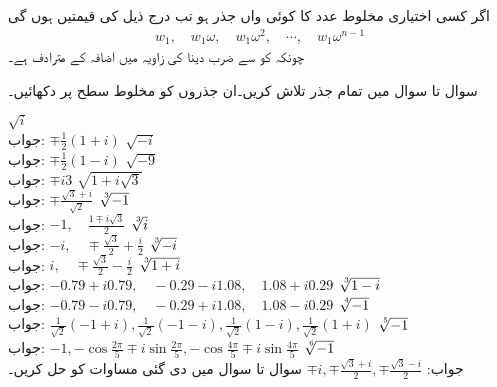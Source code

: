 اگر کسی اختیاری مخلوط عدد  کا کوئی  واں جذر  ہو تب درج ذیل  کی  قیمتیں ہوں گی
\begin{align*}
w_1,\quad w_1\omega,\quad w_1\omega^2,\quad \cdots, \quad w_1\omega^{n-1}
\end{align*}
چونکہ  کو  سے ضرب دینا  کی زاویہ میں  اضافہ کے مترادف ہے۔

سوال  تا سوال  میں تمام جذر تلاش کریں۔ان جذروں کو مخلوط سطح پر دکھائیں۔

\quad 
$\sqrt{i}$\\
جواب:\quad
$\mp\tfrac{1}{2}(1+i)$
\quad 
$\sqrt{-i}$\\
جواب:\quad
$\mp\tfrac{1}{2}(1-i)$
\quad 
$\sqrt{-9}$\\
جواب:\quad
$\mp i 3$
\quad 
$\sqrt{1+i\sqrt{3}}$\\
جواب:\quad
$ \mp\tfrac{\sqrt{3}+i}{\sqrt{2}}$
\quad 
$\sqrt[\leftroot{-2}\uproot{2}3]{-1}$\\
جواب:\quad
$-1,\quad \tfrac{1\mp i\sqrt{3}}{2}$
\quad 
$\sqrt[\leftroot{-2}\uproot{2}3]{i}$\\
جواب:\quad
$-i,\quad \mp\tfrac{\sqrt{3}}{2}+\tfrac{i}{2}$
\quad 
$\sqrt[\leftroot{-2}\uproot{2}3]{-i}$\\
جواب:\quad
$i,\quad \mp\tfrac{\sqrt{3}}{2}-\tfrac{i}{2}$
\quad 
$\sqrt[\leftroot{-2}\uproot{2}3]{1+i}$\\
جواب:\quad
$-0.79+i0.79,\quad -0.29-i1.08,\quad 1.08+i0.29$
\quad 
$\sqrt[\leftroot{-2}\uproot{2}3]{1-i}$\\
جواب:\quad
$-0.79-i0.79,\quad -0.29+i1.08,\quad 1.08-i0.29$
\quad 
$\sqrt[\leftroot{-2}\uproot{2}4]{-1}$\\
جواب:\quad
$\tfrac{1}{\sqrt{2}}(-1+i), \tfrac{1}{\sqrt{2}}(-1-i), \tfrac{1}{\sqrt{2}}(1-i), \tfrac{1}{\sqrt{2}}(1+i)$
\quad 
$\sqrt[\leftroot{-2}\uproot{2}5]{-1}$\\
جواب:\quad
$-1,-\cos\tfrac{2\pi}{5}\mp i \sin\tfrac{2\pi}{5}, -\cos\tfrac{4\pi}{5}\mp i\sin\tfrac{4\pi}{5}$
\quad 
$\sqrt[\leftroot{-2}\uproot{2}6]{-1}$\\
جواب:\quad
$\mp i,\mp\tfrac{\sqrt{3}+i}{2},\mp \tfrac{\sqrt{3}-i}{2}$
سوال  تا سوال  میں دی گئی مساوات کو حل کریں۔

